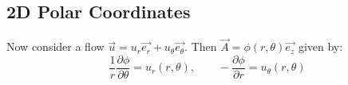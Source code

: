 \documentclass[../Main.tex]{subfiles}
\begin{document}
\subsection{2D Polar Coordinates}
Now consider a flow $\vec{u} = u_r \vec{e_r} + u_\theta \vec{e_\theta}$. Then $\vec{A} = \phi(r, \theta)\vec{e_z}$ given by:
\begin{equation*}
    \frac1r \frac{\partial \phi}{\partial \theta} = u_r(r,\theta),\qquad -\frac{\partial \phi}{\partial r} = u_\theta(r, \theta)
\end{equation*}
\end{document}
